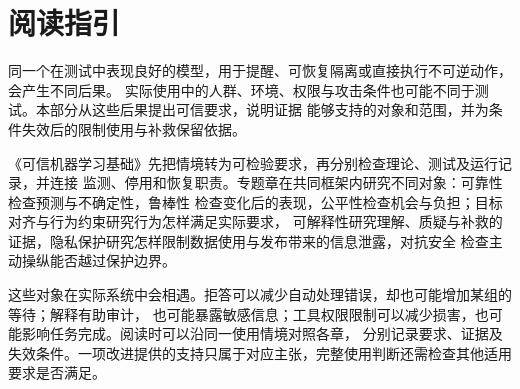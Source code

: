 \chapter*{阅读指引}

同一个在测试中表现良好的模型，用于提醒、可恢复隔离或直接执行不可逆动作，会产生不同后果。
实际使用中的人群、环境、权限与攻击条件也可能不同于测试。本部分从这些后果提出可信要求，说明证据
能够支持的对象和范围，并为条件失效后的限制使用与补救保留依据。

《可信机器学习基础》先把情境转为可检验要求，再分别检查理论、测试及运行记录，并连接
监测、停用和恢复职责。专题章在共同框架内研究不同对象：可靠性检查预测与不确定性，鲁棒性
检查变化后的表现，公平性检查机会与负担；目标对齐与行为约束研究行为怎样满足实际要求，
可解释性研究理解、质疑与补救的证据，隐私保护研究怎样限制数据使用与发布带来的信息泄露，对抗安全
检查主动操纵能否越过保护边界。

这些对象在实际系统中会相遇。拒答可以减少自动处理错误，却也可能增加某组的等待；解释有助审计，
也可能暴露敏感信息；工具权限限制可以减少损害，也可能影响任务完成。阅读时可以沿同一使用情境对照各章，
分别记录要求、证据及失效条件。一项改进提供的支持只属于对应主张，完整使用判断还需检查其他适用
要求是否满足。
